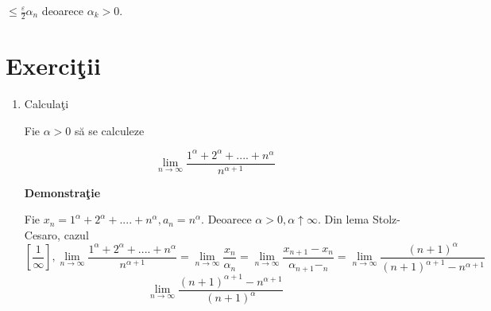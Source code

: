 \documentclass[a4paper,12pt,oneside]{report}
\begin{document}
\(\leq \frac{\varepsilon }{2}\alpha _{n}\) deoarece \(\alpha _{k}> 0\). 


\section{Exerci\c tii}

\begin{enumerate}
\item Calcula\c ti 

 Fie \(\alpha > 0\) s\u a se calculeze 

\begin{displaymath}
  \lim_{n \to \infty }\frac{1^{\alpha }+2^{\alpha }+....+n^{\alpha }}{n^{\alpha +1}}
\end{displaymath}


\textbf{Demonstra\c tie} 

Fie \(x_{n}=1^{\alpha }+2^{\alpha }+....+n^{\alpha },a_{n}= n^{\alpha }\). Deoarece \(\alpha > 0 , \alpha \uparrow \infty.\) Din lema Stolz-Cesaro, cazul 
\begin{displaymath}
  \left [ \frac{1}{\infty } \right ], 
\lim_{n \to \infty }\frac{1^{\alpha }+2^{\alpha }+....+n^{\alpha }}{n^{\alpha +1}}=\lim_{n \to \infty }\frac{x_{n}}{\alpha _{n}}= \lim_{n \to \infty } \frac{x_{n+1}-x_{n}}{\alpha _{n+1}-_{n}}=\lim_{n \to \infty } \frac{\left ( n+1 \right )^{\alpha }}{\left ( n+1 \right )^{\alpha+1} -n^{\alpha +1}}
\end{displaymath}
\begin{displaymath}
  \lim_{n \to \infty }\frac{\left ( n+1 \right )^{\alpha +1}-n^{\alpha +1}}{\left ( n+1 \right )^{\alpha }}
\end{displaymath}


\end{enumerate}
\end{document}
